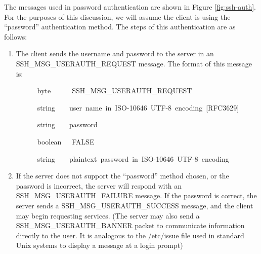 The messages used in password authentication are shown in Figure \ref{fig:ssh-auth}.
For the purposes of this discussion, we will assume the client is
using the {}``password'' authentication method. The steps of this
authentication are as follows:
\begin{enumerate}
\item The client sends the username and password to the server in an SSH\_MSG\_USERAUTH\_REQUEST
message. The format of this message is:

\begin{lyxcode}
~~~~~~byte~~~~~~SSH\_MSG\_USERAUTH\_REQUEST

~~~~~~string~~~~user~name~in~ISO-10646~UTF-8~encoding~{[}RFC3629{]}

~~~~~~string~~~~\textquotedbl{}password\textquotedbl{}

~~~~~~boolean~~~FALSE

~~~~~~string~~~~plaintext~password~in~ISO-10646~UTF-8~encoding~


\end{lyxcode}
\item If the server does not support the {}``password'' method chosen,
or the password is incorrect, the server will respond with an SSH\_MSG\_USERAUTH\_FAILURE
message. If the password is correct, the server sends a SSH\_MSG\_USERAUTH\_SUCCESS
message, and the client may begin requesting services. (The server
may also send a SSH\_MSG\_USERAUTH\_BANNER packet to communicate information
directly to the user. It is analogous to the /etc/issue file used
in standard Unix systems to display a message at a login prompt)
\end{enumerate}
%
